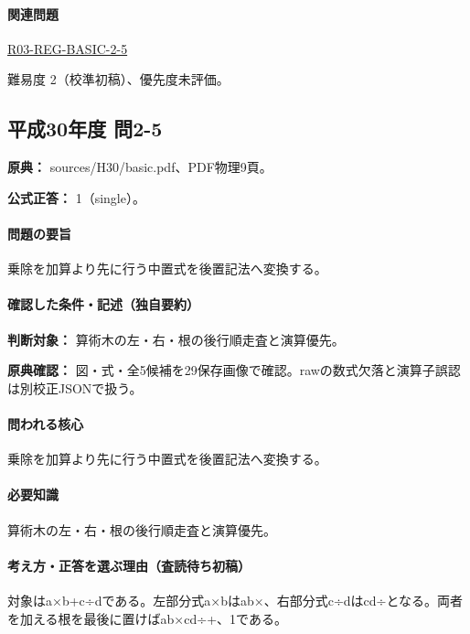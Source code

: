 \paragraph{関連問題} \hyperref[q:r03-reg-basic-2-5]{R03-REG-BASIC-2-5}

\par 難易度 2（校準初稿）、優先度未評価。

\subsection{平成30年度 問2-5}
\label{q:h30-reg-basic-2-5}

\noindent\textbf{原典：} sources/H30/basic.pdf、PDF物理9頁。

\textbf{公式正答：} 1（single）。

\paragraph{問題の要旨} 乗除を加算より先に行う中置式を後置記法へ変換する。

\paragraph{確認した条件・記述（独自要約）}\mbox{}\par

\noindent\textbf{判断対象：} 算術木の左・右・根の後行順走査と演算優先。\par

\noindent\textbf{原典確認：} 図・式・全5候補を29保存画像で確認。rawの数式欠落と演算子誤認は別校正JSONで扱う。\par

\paragraph{問われる核心} 乗除を加算より先に行う中置式を後置記法へ変換する。

\paragraph{必要知識} 算術木の左・右・根の後行順走査と演算優先。

\paragraph{考え方・正答を選ぶ理由（査読待ち初稿）} 対象はa×b+c÷dである。左部分式a×bはab×、右部分式c÷dはcd÷となる。両者を加える根を最後に置けばab×cd÷+、1である。

